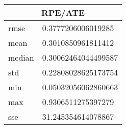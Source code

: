\begin{table}[!ht] 
 \centering 
 \begin{tabular}{|l|l|} \hline 
 \multicolumn{2}{|c|}{RPE/ATE} \\ \hline 
 rmse & 0.3777206006019285 \\ \hline 
mean & 0.3010850961811412 \\ \hline 
median & 0.30062464044499587 \\ \hline 
std & 0.22808028625173754 \\ \hline 
min & 0.05032056062860663 \\ \hline 
max & 0.9306511275397279 \\ \hline 
sse & 31.245354614078867 \\ \hline 
\end{tabular} 
 \end{table}